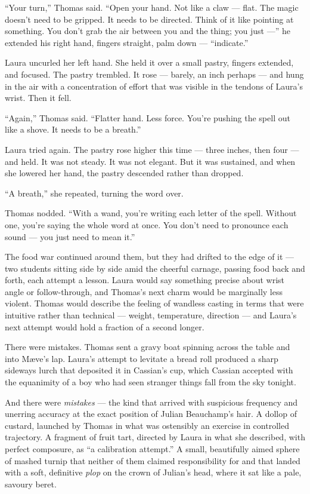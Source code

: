 \enquote{Your turn,} Thomas said. \enquote{Open your hand. Not like a claw --- flat. The magic doesn't need to be gripped. It needs to be directed. Think of it like pointing at something. You don't grab the air between you and the thing; you just ---} he extended his right hand, fingers straight, palm down --- \enquote{indicate.}
 
Laura uncurled her left hand. She held it over a small pastry, fingers extended, and focused. The pastry trembled. It rose --- barely, an inch perhaps --- and hung in the air with a concentration of effort that was visible in the tendons of Laura's wrist. Then it fell.
 
\enquote{Again,} Thomas said. \enquote{Flatter hand. Less force. You're pushing the spell out like a shove. It needs to be a breath.}
 
Laura tried again. The pastry rose higher this time --- three inches, then four --- and held. It was not steady. It was not elegant. But it was sustained, and when she lowered her hand, the pastry descended rather than dropped.
 
\enquote{A breath,} she repeated, turning the word over.
 
Thomas nodded. \enquote{With a wand, you're writing each letter of the spell. Without one, you're saying the whole word at once. You don't need to pronounce each sound --- you just need to mean it.}
 
The food war continued around them, but they had drifted to the edge of it --- two students sitting side by side amid the cheerful carnage, passing food back and forth, each attempt a lesson. Laura would say something precise about wrist angle or follow-through, and Thomas's next charm would be marginally less violent. Thomas would describe the feeling of wandless casting in terms that were intuitive rather than technical --- weight, temperature, direction --- and Laura's next attempt would hold a fraction of a second longer.
 
There were mistakes. Thomas sent a gravy boat spinning across the table and into Mæve's lap. Laura's attempt to levitate a bread roll produced a sharp sideways lurch that deposited it in Cassian's cup, which Cassian accepted with the equanimity of a boy who had seen stranger things fall from the sky tonight.
 
And there were \textit{mistakes} --- the kind that arrived with suspicious frequency and unerring accuracy at the exact position of Julian Beauchamp's hair. A dollop of custard, launched by Thomas in what was ostensibly an exercise in controlled trajectory. A fragment of fruit tart, directed by Laura in what she described, with perfect composure, as \enquote{a calibration attempt.} A small, beautifully aimed sphere of mashed turnip that neither of them claimed responsibility for and that landed with a soft, definitive \textit{plop} on the crown of Julian's head, where it sat like a pale, savoury beret.
 
